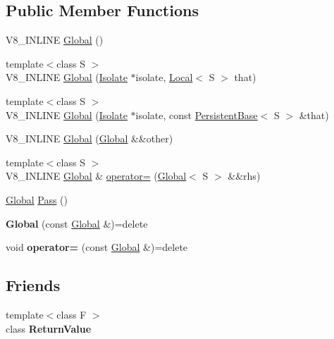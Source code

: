 \subsection*{Public Member Functions}
\begin{DoxyCompactItemize}
\item 
V8\+\_\+\+I\+N\+L\+I\+NE \mbox{\hyperlink{classv8_1_1Global_ab1efdf25ff6305e67f3266a6fe90527e}{Global}} ()
\item 
{\footnotesize template$<$class S $>$ }\\V8\+\_\+\+I\+N\+L\+I\+NE \mbox{\hyperlink{classv8_1_1Global_a8434bb6729eb4cd0cd85ad81bd8344ad}{Global}} (\mbox{\hyperlink{classv8_1_1Isolate}{Isolate}} $\ast$isolate, \mbox{\hyperlink{classv8_1_1Local}{Local}}$<$ S $>$ that)
\item 
{\footnotesize template$<$class S $>$ }\\V8\+\_\+\+I\+N\+L\+I\+NE \mbox{\hyperlink{classv8_1_1Global_a6243ecb28bb97d066065796fa28f7415}{Global}} (\mbox{\hyperlink{classv8_1_1Isolate}{Isolate}} $\ast$isolate, const \mbox{\hyperlink{classv8_1_1PersistentBase}{Persistent\+Base}}$<$ S $>$ \&that)
\item 
V8\+\_\+\+I\+N\+L\+I\+NE \mbox{\hyperlink{classv8_1_1Global_ab8f3c754a58146e6db67012cd74a49cb}{Global}} (\mbox{\hyperlink{classv8_1_1Global}{Global}} \&\&other)
\item 
{\footnotesize template$<$class S $>$ }\\V8\+\_\+\+I\+N\+L\+I\+NE \mbox{\hyperlink{classv8_1_1Global}{Global}} \& \mbox{\hyperlink{classv8_1_1Global_a9d3d7d8f10ad23e413f2027cc15ab209}{operator=}} (\mbox{\hyperlink{classv8_1_1Global}{Global}}$<$ S $>$ \&\&rhs)
\item 
\mbox{\hyperlink{classv8_1_1Global}{Global}} \mbox{\hyperlink{classv8_1_1Global_a914903149cc752468d4a3a11b6089c7e}{Pass}} ()
\item 
\mbox{\label{classv8_1_1Global_aefdf6b7bc98d7d011e1381b7cac7fa33}} 
{\bfseries Global} (const \mbox{\hyperlink{classv8_1_1Global}{Global}} \&)=delete
\item 
\mbox{\label{classv8_1_1Global_a732256fcf3edd799c55ba559921dff03}} 
void {\bfseries operator=} (const \mbox{\hyperlink{classv8_1_1Global}{Global}} \&)=delete
\end{DoxyCompactItemize}
\subsection*{Friends}
\begin{DoxyCompactItemize}
\item 
\mbox{\label{classv8_1_1Global_a53f604d3d6f2dc0647df33c9979f116a}} 
{\footnotesize template$<$class F $>$ }\\class {\bfseries Return\+Value}
\end{DoxyCompactItemize}


